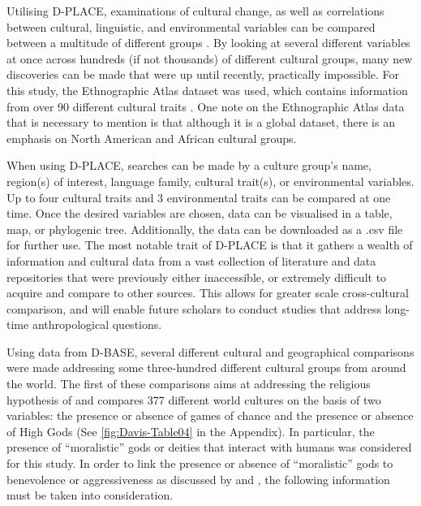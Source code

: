 \documentclass[%
	]{ijsra}
\begin{document}
 Utilising D-PLACE, examinations of cultural change, as well as correlations between cultural, linguistic, and environmental variables can be compared between a multitude of different groups \parencite{kirby2016}. By looking at several different variables at once across hundreds (if not thousands) of different cultural groups, many new discoveries can be made that were up until recently, practically impossible. For this study, the Ethnographic Atlas dataset was used, which contains information from over 90 different cultural traits \parencite{kirby2016}. One note on the Ethnographic Atlas data that is necessary to mention is that although it is a global dataset, there is an emphasis on North American and African cultural groups.
 
 When using D-PLACE, searches can be made by a culture group’s name, region(s) of interest, language family, cultural trait(s), or environmental variables. Up to four cultural traits and 3 environmental traits can be compared at one time. Once the desired variables are chosen, data can be visualised in a table, map, or phylogenic tree. Additionally, the data can be downloaded as a .csv file for further use. The most notable trait of D-PLACE is that it gathers a wealth of information and cultural data from a vast collection of literature and data repositories \parencite{kirby2016} that were previously either inaccessible, or extremely difficult to acquire and compare to other sources. This allows for greater scale cross-cultural comparison, and will enable future scholars to conduct studies that address long-time anthropological questions.

Using data from D-BASE, several different cultural and geographical comparisons were made addressing some three-hundred different cultural groups from around the world. The first of these comparisons aims at addressing the religious hypothesis of \textcite{roberts1959} and compares 377 different world cultures on the basis of two variables: the presence or absence of games of chance and the presence or absence of High Gods (See \cref{fig:Davis-Table04} in the Appendix).%
 In particular, the presence of ``moralistic” gods or deities that interact with humans was considered for this study. In order to link the presence or absence of ``moralistic” gods to benevolence or aggressiveness as discussed by \textcite{lambert1959} and \textcite{roberts1959}, the following information must be taken into consideration. 
\end{document}
